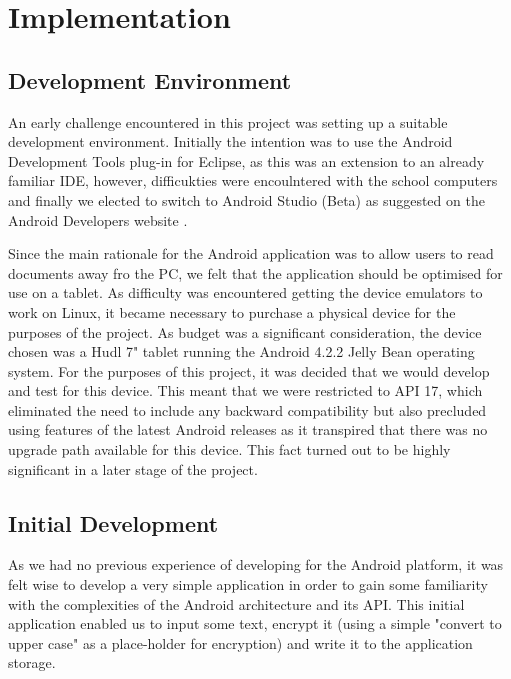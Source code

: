 
\chapter{Implementation}
\label{cha:imp}
\section{Development Environment}
An early challenge encountered in this project was setting up a suitable development environment.  Initially the intention was to use the Android Development Tools plug-in for Eclipse, as this was an extension to an already familiar IDE, however, difficukties were encoulntered with the school computers and finally we elected to switch to Android Studio (Beta) as suggested on the Android Developers website \cite{android_dev}.  

Since the main rationale for the Android application was to allow users to read documents away fro the PC, we felt that the application should be optimised for use on a tablet.  As difficulty was encountered getting the device emulators to work on Linux, it became necessary to purchase a physical device for the purposes of the project.  As budget was a significant consideration, the device chosen was a Hudl 7" tablet running the Android 4.2.2 Jelly Bean operating system.  For the purposes of this project, it was decided that we would develop and test for this device.  This meant that we were restricted to API 17, which eliminated the need to include any backward compatibility but also precluded using features of the latest Android releases as it transpired that there was no upgrade path available for this device.  This fact turned out to be highly significant in a later stage of the project.  

\section{Initial Development}
As we had no previous experience of developing for the Android platform, it was felt wise to develop a very simple application in order to gain some familiarity with the complexities of the Android architecture and its API. This initial application enabled us to input some text, encrypt it (using a simple "convert to upper case" as a place-holder for encryption) and write it to the application storage.  

